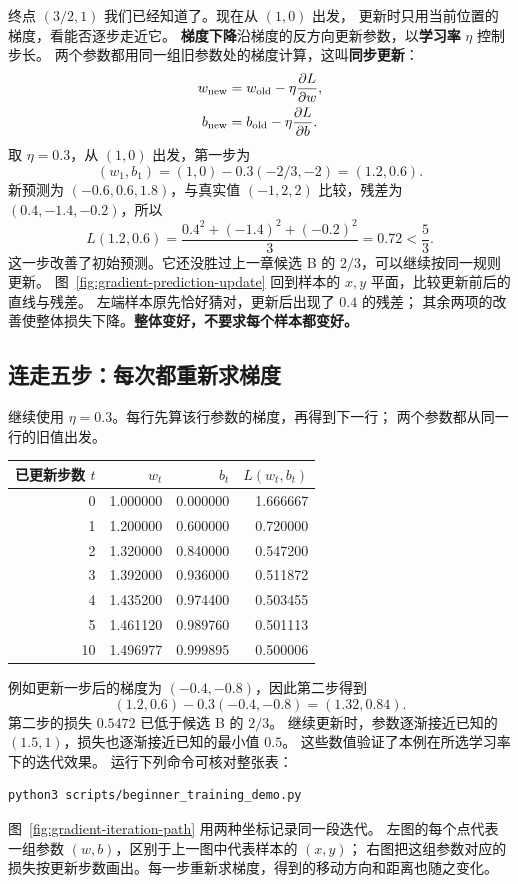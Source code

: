 终点 $(3/2,1)$ 我们已经知道了。现在从 $(1,0)$ 出发，
更新时只用当前位置的梯度，看能否逐步走近它。
\textbf{梯度下降}沿梯度的反方向更新参数，以\textbf{学习率} $\eta$ 控制步长。
两个参数都用同一组旧参数处的梯度计算，这叫\textbf{同步更新}：
\begin{equation}
\boxed{\begin{aligned}
w_{\rm new}&=w_{\rm old}-\eta\frac{\partial L}{\partial w},\\
b_{\rm new}&=b_{\rm old}-\eta\frac{\partial L}{\partial b}.
\end{aligned}}
\label{eq:gradient-simple}
\end{equation}
取 $\eta=0.3$，从 $(1,0)$ 出发，第一步为
\[
(w_1,b_1)=(1,0)-0.3(-2/3,-2)=\boxed{(1.2,0.6)}.
\]
新预测为 $(-0.6,0.6,1.8)$，与真实值 $(-1,2,2)$ 比较，残差为 $(0.4,-1.4,-0.2)$，所以
\[
L(1.2,0.6)=\frac{0.4^2+(-1.4)^2+(-0.2)^2}{3}=\boxed{0.72}<\frac53.
\]
这一步改善了初始预测。它还没胜过上一章候选 B 的 $2/3$，可以继续按同一规则更新。
图~\ref{fig:gradient-prediction-update} 回到样本的 $x,y$ 平面，比较更新前后的直线与残差。
左端样本原先恰好猜对，更新后出现了 $0.4$ 的残差；
其余两项的改善使整体损失下降。\textbf{整体变好，不要求每个样本都变好。}


\subsection{连走五步：每次都重新求梯度}
\label{experiment:beginner-iteration}

继续使用 $\eta=0.3$。每行先算该行参数的梯度，再得到下一行；
两个参数都从同一行的旧值出发。
\begin{center}\small
{}
\begin{tabular}{rrrr}
\toprule
已更新步数 $t$ & $w_t$ & $b_t$ & $L(w_t,b_t)$\\\midrule
0 & 1.000000 & 0.000000 & 1.666667\\
1 & 1.200000 & 0.600000 & 0.720000\\
2 & 1.320000 & 0.840000 & 0.547200\\
3 & 1.392000 & 0.936000 & 0.511872\\
4 & 1.435200 & 0.974400 & 0.503455\\
5 & 1.461120 & 0.989760 & 0.501113\\
10 & 1.496977 & 0.999895 & 0.500006\\
\bottomrule
\end{tabular}
\end{center}
例如更新一步后的梯度为 $(-0.4,-0.8)$，因此第二步得到
\[
(1.2,0.6)-0.3(-0.4,-0.8)=(1.32,0.84).
\]
第二步的损失 $0.5472$ 已低于候选 B 的 $2/3$。
继续更新时，参数逐渐接近已知的 $(1.5,1)$，损失也逐渐接近已知的最小值 $0.5$。
这些数值验证了本例在所选学习率下的迭代效果。
运行下列命令可核对整张表：
\begin{verbatim}
python3 scripts/beginner_training_demo.py
\end{verbatim}
图~\ref{fig:gradient-iteration-path} 用两种坐标记录同一段迭代。
左图的每个点代表一组参数 $(w,b)$，区别于上一图中代表样本的 $(x,y)$；
右图把这组参数对应的损失按更新步数画出。每一步重新求梯度，得到的移动方向和距离也随之变化。


